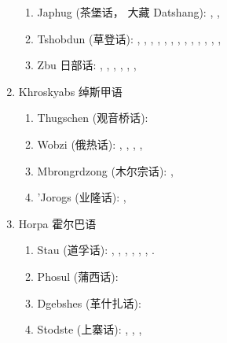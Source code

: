 \documentclass[oldfontcommands,oneside,a4paper,11pt]{article}
\newcommand{\zh}[1]{{\cn #1}}
\newcommand{\langue}[2]{#1}
\begin{document}
\begin{enumerate}
\begin{enumerate}
\item Japhug (\zh{茶堡话， 大藏} Datshang): \citet{linxr93jiarong}, \citet{linluo03}, \citet{lin11direction}
\item Tshobdun (\zh{草登话}):  \citet{jackson94caodeng}, \citet{jackson98morphology}, \citet{jackson00sidaba}, \citet{jackson02rentongdengdi}, \citet{jackson03caodeng}, \citet{jackson04zhuangmaoci}, \citet{jackson05yingao},  \citet{jackson06paisheng}, \citet{jackson06guanxiju}, \citet{jackson07irrealis}, \citet{jacksonlin07}, \citet{sun12complementation}, \citet{sun14generic}, \citet{jackson14morpho}
\item Zbu \zh{日部话}: \citet{linxr93jiarong}, \citet{jackson00puxi}, \citet{jackson00sidaba}, \citet{jackson04showu}, \citet{jacques08}, \citet{gongxun14agreement}, 
\end{enumerate}
\item \langue{Khroskyabs \zh{绰斯甲语}}{Khroskyabs \zh{绰斯甲语}}
\begin{enumerate}
\item Thugschen (\zh{观音桥话}): \citet{huangbf07lavrung}
\item Wobzi (\zh{俄热话}): \citet{linxr93jiarong}, \citet{lai13fuyin}, \citet{lai13affixale}, \citet{lai14caus}, \citet{lai14person}
\item Mbrongrdzong (\zh{木尔宗话}): \citet{jackson00sidaba}, \citet{jackson05yingao}
\item 'Jorogs (\zh{业隆话}):  \citet{yin07yelong}, 
\end{enumerate}
\item \langue{Horpa \zh{霍尔巴语}}{Horpa \zh{霍尔巴语}}
\begin{enumerate} 
\item Stau (\zh{道孚话}): \citet{hodgson57sifan}, \citet{wang70stau}, \citet{sun83liujiang},  \citet{huangbf91daofu}, \citet{sun13gexi}, \citet{antonov14rtau}, \citet{jacques14rtau}.
\item Phosul (\zh{蒲西话}): \citet{jackson00puxi}
\item Dgebshes (\zh{革什扎话}): \citet{duoerji98geshizha}
\item Stodste (\zh{上寨话}): \citet{jackson00sidaba}, \citet{qu07shangzhai}, \citet{jackson07shangzhai},
\end{enumerate}
\end{enumerate}
\end{document}
